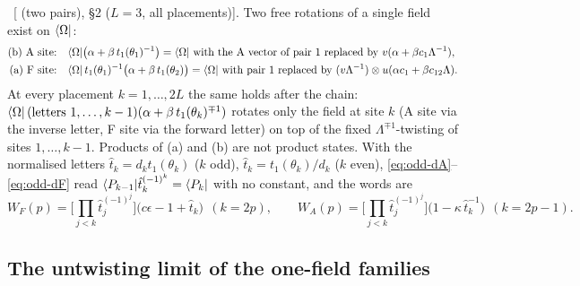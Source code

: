 \ex\ [ (two pairs),  \S2 ($L=3$, all placements)]. Two free
rotations of a single field exist on $\langle\Omega|$:
\begin{align}
 \text{(b) A site:}\quad &\bra\Omega\big(\alpha+\beta\,t_1(\theta_1)^{-1}\big)=\bra\Omega\ \text{with the A vector of pair 1 replaced by }v(\alpha+\beta c_1\Lambda^{-1}),\\
 \text{(a) F site:}\quad &\bra\Omega\,t_1(\theta_1)^{-1}\big(\alpha+\beta\,t_1(\theta_2)\big)=\bra\Omega\ \text{with pair 1 replaced by }(v\Lambda^{-1})\otimes u(\alpha c_1+\beta c_{12}\Lambda).
\end{align}
At every placement $k=1,\dots,2L$ the same holds after the chain: $\langle\Omega|\,(\text{letters }1,\dots,k-1)(\alpha+\beta\,t_1(\theta_k)^{\mp1})$
rotates only the field at site $k$ (A site via the inverse letter, F site via the forward letter) on top of the fixed
$\Lambda^{\mp1}$-twisting of sites $1,\dots,k-1$. Products of (a) and (b) are not product states. With the normalised letters
$\hat t_k=d_kt_1(\theta_k)$ ($k$ odd), $\hat t_k=t_1(\theta_k)/d_k$ ($k$ even), \eqref{eq:odd-dA}--\eqref{eq:odd-dF} read
$\langle P_{k-1}|\hat t_k^{(-1)^k}=\langle P_k|$ with no constant, and the words are
\begin{equation}\label{eq:odd-words}
 W_F(p)=\Big[\prod_{j<k}\hat t_j^{(-1)^j}\Big]\big(c\epsilon-1+\hat t_k\big)\ \ (k=2p),\qquad
 W_A(p)=\Big[\prod_{j<k}\hat t_j^{(-1)^j}\Big]\big(1-\kappa\,\hat t_k^{-1}\big)\ \ (k=2p-1).
\end{equation}

\subsection{The untwisting limit of the one-field families}\label{sec:odd-limit}

